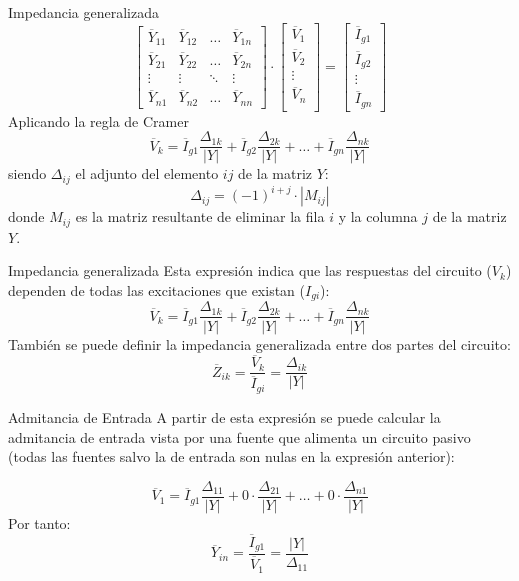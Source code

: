 \documentclass[aspectratio=169, usenames,svgnames,dvipsnames]{beamer}
\begin{document}
\begin{frame}[label={sec:org937fa12}]{Impedancia generalizada}
\begin{equation*}
  \begin{bmatrix}
    \overline{Y}_{11} & \overline{Y}_{12} & \dots & \overline{Y}_{1n} \\
    \overline{Y}_{21} & \overline{Y}_{22} & \dots & \overline{Y}_{2n} \\
    \vdots & \vdots & \ddots & \vdots \\
    \overline{Y}_{n1} & \overline{Y}_{n2} &  \dots & \overline{Y}_{nn}
  \end{bmatrix} \cdot %
  \begin{bmatrix}
    \overline{V}_1\\
    \overline{V}_2\\
    \vdots \\
    \overline{V}_n\\
  \end{bmatrix} = %
  \begin{bmatrix}
    \overline{I}_{g1}\\
    \overline{I}_{g2}\\
    \vdots \\
    \overline{I}_{gn}
  \end{bmatrix}
\end{equation*}
Aplicando la regla de Cramer
\[
  \overline{V}_k = \overline{I}_{g1} \frac{\Delta_{1k}}{|Y|} + \overline{I}_{g2} \frac{\Delta_{2k}}{|Y|} + \dots + \overline{I}_{gn} \frac{\Delta_{nk}}{|Y|}
\]
siendo \(\Delta_{ij}\) el adjunto del elemento \(ij\) de la matriz \(Y\):
\[
  \Delta_{ij} = (-1)^{i+j} \cdot |M_{ij}|
\]
donde \(M_{ij}\) es la matriz resultante de eliminar la fila \(i\) y la columna \(j\) de la matriz \(Y\).
\end{frame}

\begin{frame}[label={sec:orgc3ad7ff}]{Impedancia generalizada}
Esta expresión indica que las respuestas del circuito (\(V_k\)) dependen de todas las excitaciones que existan (\(I_{gi}\)):
\[
  \overline{V}_k = \overline{I}_{g1} \frac{\Delta_{1k}}{|Y|} + \overline{I}_{g2} \frac{\Delta_{2k}}{|Y|} + \dots + \overline{I}_{gn} \frac{\Delta_{nk}}{|Y|}
\]
También se puede definir la impedancia generalizada entre dos partes del circuito:
\[
  \overline{Z}_{ik} = \frac{\overline{V}_k}{\overline{I}_{gi}} = \frac{\Delta_{ik}}{|Y|}
\]
\end{frame}

\begin{frame}[label={sec:orga9d3bf7}]{Admitancia de Entrada}
A partir de esta expresión se puede calcular la admitancia de entrada vista por una fuente que alimenta un circuito pasivo (todas las fuentes salvo la de entrada son nulas en la expresión anterior):

\[
  \overline{V}_1 = \overline{I}_{g1} \frac{\Delta_{11}}{|Y|} + 0 \cdot \frac{\Delta_{21}}{|Y|} + \dots + 0 \cdot \frac{\Delta_{n1}}{|Y|}
\]
Por tanto:
\[
  \boxed{\overline{Y}_{in} = \frac{\overline{I}_{g1}}{\overline{V}_1}=  \frac{|Y|}{\Delta_{11}}}
\]
\end{frame}
\end{document}
